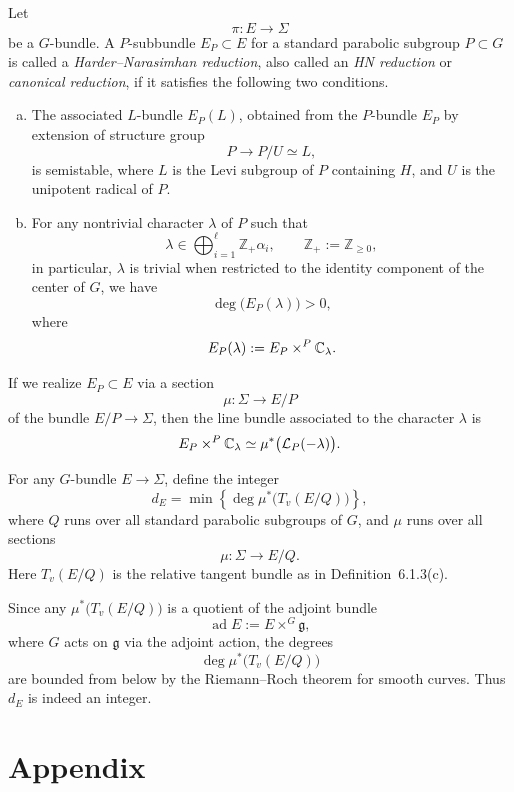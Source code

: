 \documentclass[12pt]{article}
\begin{document}
\begin{definition}\label{def:HN-reduction-G-bundle}
Let
\[
\pi:E\to \Sigma
\]
be a \(G\)-bundle. A \(P\)-subbundle $E_P\subset E$
for a standard parabolic subgroup \(P\subset G\) is called a \emph{Harder--Narasimhan reduction}, also called an \emph{HN reduction} or \emph{canonical reduction}, if it satisfies the following two conditions.

\begin{enumerate}[(a)]
\item The associated \(L\)-bundle \(E_P(L)\), obtained from the \(P\)-bundle \(E_P\) by extension of structure group
\[
P\to P/U\simeq L,
\]
is semistable, where \(L\) is the Levi subgroup of \(P\) containing \(H\), and \(U\) is the unipotent radical of \(P\).

\item For any nontrivial character \(\lambda\) of \(P\) such that
\[
\lambda\in \bigoplus_{i=1}^{\ell}\mathbb Z_+\alpha_i,
\qquad
\mathbb Z_+:=\mathbb Z_{\ge 0},
\]
in particular, \(\lambda\) is trivial when restricted to the identity component of the center of \(G\), we have
\[
\deg\bigl(E_P(\lambda)\bigr)>0,
\]
where
\[
E_P(\lambda):=E_P\times^P \mathbb{C}_\lambda.
\]
\end{enumerate}
If we realize \(E_P\subset E\) via a section
\[
\mu:\Sigma\to E/P
\]
of the bundle \(E/P\to \Sigma\), then the line bundle associated to the character \(\lambda\) is
\[
E_P\times^P \mathbb{C}_\lambda
\simeq
\mu^*\bigl(\mathcal L_P(-\lambda)\bigr).
\]
\end{definition}

\begin{definition}\label{def:d_E}
For any \(G\)-bundle \(E\to \Sigma\), define the integer
\[
d_E
=
\min\left\{
\deg \mu^*\bigl(T_v(E/Q)\bigr)
\right\},
\]
where \(Q\) runs over all standard parabolic subgroups of \(G\), and \(\mu\) runs over all sections
\[
\mu:\Sigma\to E/Q.
\]
Here \(T_v(E/Q)\) is the relative tangent bundle as in Definition~6.1.3(c).

Since any \(\mu^*\bigl(T_v(E/Q)\bigr)\) is a quotient of the adjoint bundle
\[
\operatorname{ad}E:=E\times^G\mathfrak g,
\]
where \(G\) acts on \(\mathfrak g\) via the adjoint action, the degrees
\[
\deg \mu^*\bigl(T_v(E/Q)\bigr)
\]
are bounded from below by the Riemann--Roch theorem for smooth curves. Thus \(d_E\) is indeed an integer.
\end{definition}

\section{Appendix}
\end{document}
